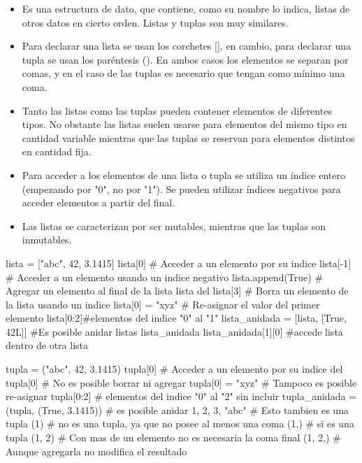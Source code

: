 \begin{itemize}

\item Es una estructura de dato, que contiene, como su nombre lo indica, listas de otros datos en cierto orden. Listas y tuplas son muy similares.

\item Para declarar una lista se usan los corchetes [], en cambio, para declarar una tupla se usan los paréntesis (). En ambos casos los elementos se separan por comas, y en el caso de las tuplas es necesario que tengan como mínimo una coma.

\item    Tanto las listas como las tuplas pueden contener elementos de diferentes tipos. No obstante las listas suelen usarse para elementos del mismo tipo en cantidad variable mientras que las tuplas se reservan para elementos distintos en cantidad fija.
    
\item Para acceder a los elementos de una lista o tupla se utiliza un índice entero (empezando por "0", no por "1"). Se pueden utilizar índices negativos para acceder elementos a partir del final.


\item Las listas se caracterizan por ser mutables, mientras que las tuplas son inmutables.

\end{itemize}






\begin{pyconsole}
lista = ["abc", 42, 3.1415]
lista[0] # Acceder a un elemento por su indice
lista[-1] # Acceder a un elemento usando un indice negativo
lista.append(True) # Agregar un elemento al final de la lista
lista
del lista[3] # Borra un elemento de la lista usando un indice
lista[0] = "xyz" # Re-asignar el valor del primer elemento
lista[0:2]#elementos del indice "0" al "1" 
lista_anidada = [lista, [True, 42L]] #Es posible anidar listas
lista_anidada
lista_anidada[1][0] #accede lista dentro de otra lista
\end{pyconsole}

\begin{pyconsole}
tupla = ("abc", 42, 3.1415)
tupla[0] # Acceder a un elemento por su indice
del tupla[0] # No es posible borrar ni agregar
tupla[0] = "xyz" # Tampoco es posible re-asignar
tupla[0:2] # elementos del indice "0" al "2" sin incluir
tupla_anidada = (tupla, (True, 3.1415)) # es posible anidar
1, 2, 3, "abc" # Esto tambien es una tupla
(1) #  no es una tupla, ya que no posee al menos una coma
(1,) # si es una tupla
(1, 2) # Con mas de un elemento no es necesaria la coma final
(1, 2,) # Aunque agregarla no modifica el resultado
\end{pyconsole}

